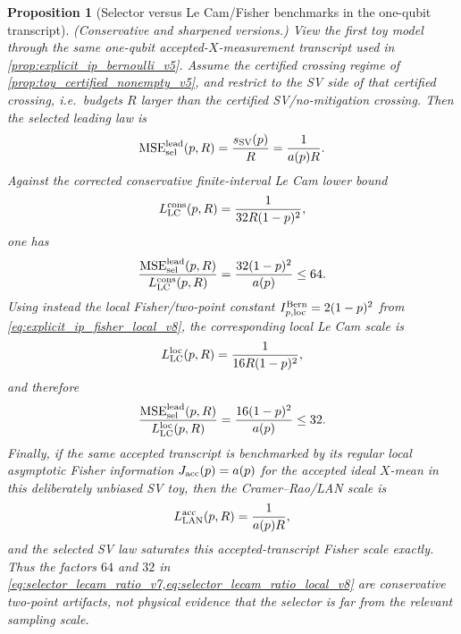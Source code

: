 \documentclass[11pt]{article}
\newtheorem{proposition}{Proposition}
\newcommand{\MSE}{\operatorname{MSE}}
\newcommand{\1}{\mathbf{1}}
\begin{document}
\begin{proposition}[Selector versus Le Cam/Fisher benchmarks in the one-qubit transcript]
\label{prop:selector_lecam_constant_factor_v8}
\textup{(Conservative and sharpened versions.)}
View the first toy model through the same one-qubit accepted-\(X\)-measurement transcript used in \cref{prop:explicit_ip_bernoulli_v5}.  Assume the certified crossing regime of \cref{prop:toy_certified_nonempty_v5}, and restrict to the SV side of that certified crossing, i.e.\ budgets \(R\) larger than the certified SV/no-mitigation crossing.  Then the selected leading law is
\begin{equation}
    \MSE_{\rm sel}^{\rm lead}(p,R)=\frac{s_{\mathrm{SV}}(p)}{R}=\frac{1}{a(p)R}.
\end{equation}
Against the corrected conservative finite-interval Le Cam lower bound
\begin{equation}
    L_{\rm LC}^{\rm cons}(p,R)=\frac{1}{32R(1-p)^2},
\end{equation}
one has
\begin{equation}
    \frac{\MSE_{\rm sel}^{\rm lead}(p,R)}{L_{\rm LC}^{\rm cons}(p,R)}
    =\frac{32(1-p)^2}{a(p)}\le64.
    \label{eq:selector_lecam_ratio_v7}
\end{equation}
Using instead the local Fisher/two-point constant \(I_{p,\mathrm{loc}}^{\rm Bern}=2(1-p)^2\) from \cref{eq:explicit_ip_fisher_local_v8}, the corresponding local Le Cam scale is
\begin{equation}
    L_{\rm LC}^{\rm loc}(p,R)=\frac{1}{16R(1-p)^2},
\end{equation}
and therefore
\begin{equation}
    \frac{\MSE_{\rm sel}^{\rm lead}(p,R)}{L_{\rm LC}^{\rm loc}(p,R)}
    =\frac{16(1-p)^2}{a(p)}\le32.
    \label{eq:selector_lecam_ratio_local_v8}
\end{equation}
Finally, if the same accepted transcript is benchmarked by its regular local asymptotic Fisher information \(J_{\rm acc}(p)=a(p)\) for the accepted ideal \(X\)-mean in this deliberately unbiased SV toy, then the Cramer--Rao/LAN scale is
\begin{equation}
    L_{\rm LAN}^{\rm acc}(p,R)=\frac{1}{a(p)R},
\end{equation}
and the selected SV law saturates this accepted-transcript Fisher scale exactly.  Thus the factors \(64\) and \(32\) in \cref{eq:selector_lecam_ratio_v7,eq:selector_lecam_ratio_local_v8} are conservative two-point artifacts, not physical evidence that the selector is far from the relevant sampling scale.
\end{proposition}
\end{document}

